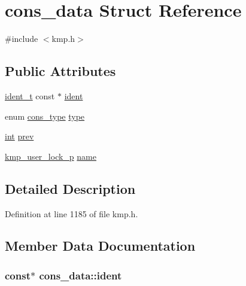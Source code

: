 \hypertarget{structcons__data}{\section{cons\-\_\-data Struct Reference}
\label{structcons__data}
}


{\ttfamily \#include $<$kmp.\-h$>$}

\subsection*{Public Attributes}
\begin{DoxyCompactItemize}
\item 
\hyperlink{group__BASIC__TYPES_ga690fda6b92f039a72db263c6b4394ddb}{ident\-\_\-t} const $\ast$ \hyperlink{structcons__data_a0c586fe208c4f8a2f7deaf145710045b}{ident}
\item 
enum \hyperlink{kmp_8h_a1582e7ddc609220a660d10244ef3e315}{cons\-\_\-type} \hyperlink{structcons__data_a6e32717dd06d661e44e920a0b2d35db3}{type}
\item 
\hyperlink{ittnotify__static_8h_a8b8dcd723308a8cb5d84277c7a3fff70}{int} \hyperlink{structcons__data_ac25aa2afe905faf60427d1590f7795eb}{prev}
\item 
\hyperlink{kmp__lock_8h_a35c88b3ea74b2a8d633ec8156c1c4670}{kmp\-\_\-user\-\_\-lock\-\_\-p} \hyperlink{structcons__data_a2505ac1ca9e905c68f9770d7bfc41214}{name}
\end{DoxyCompactItemize}


\subsection{Detailed Description}


Definition at line 1185 of file kmp.\-h.



\subsection{Member Data Documentation}
\hypertarget{structcons__data_a0c586fe208c4f8a2f7deaf145710045b}{
\subsubsection[{ident}]{ const$\ast$ cons\-\_\-data\-::ident}}\label{structcons__data_a0c586fe208c4f8a2f7deaf145710045b}


